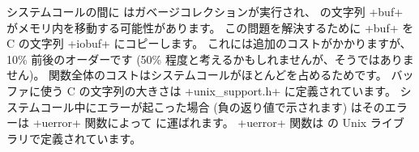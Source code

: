 システムコールの間に \ocaml はガベージコレクションが実行され、
\ocaml の文字列 \ml+buf+ がメモリ内を移動する可能性があります。
この問題を解決するために \ml+buf+ を C の文字列 \ml+iobuf+ にコピーします。
これには追加のコストがかかりますが、10\% 前後のオーダーです (50\% 程度と考えるかもしれませんが、そうではありません)。
関数全体のコストはシステムコールがほとんどを占めるためです。
バッファに使う C の文字列の大きさは \ml+unix_support.h+ に定義されています。
システムコール中にエラーが起こった場合 (負の返り値で示されます) はそのエラーは
\ml+uerror+ 関数によって \ocaml に運ばれます。 \ml+uerror+ 関数は \ocaml の Unix ライブラリで定義されています。

